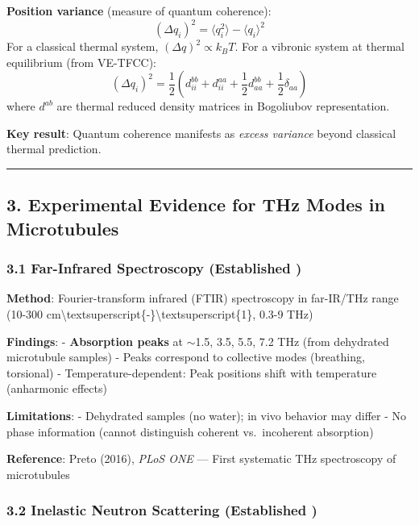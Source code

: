 \textbf{Position variance} (measure of quantum coherence):
\[(\Delta q_i)^2 = \langle q_i^2 \rangle - \langle q_i \rangle^2\] For a
classical thermal system, \((\Delta q)^2 \propto k_B T\). For a vibronic
system at thermal equilibrium (from VE-TFCC):
\[(\Delta q_i)^2 = \frac{1}{2} \left( d_{ii}^{bb} + d_{ii}^{aa} + \frac{1}{2} d_{aa}^{bb} + \frac{1}{2} \delta_{aa} \right)\]
where \(d^{ab}\) are thermal reduced density matrices in Bogoliubov
representation.

\textbf{Key result}: Quantum coherence manifests as \emph{excess
variance} beyond classical thermal prediction.

\begin{center}\rule{0.5\linewidth}{0.5pt}\end{center}

\subsection{3. Experimental Evidence for THz Modes in
Microtubules}\label{experimental-evidence-for-thz-modes-in-microtubules}

\subsubsection{3.1 Far-Infrared Spectroscopy (Established
)}\label{far-infrared-spectroscopy-established}

\textbf{Method}: Fourier-transform infrared (FTIR) spectroscopy in
far-IR/THz range (10-300
cm\textbackslash textsuperscript\{-\}\textbackslash textsuperscript\{1\},
0.3-9 THz)

\textbf{Findings}: - \textbf{Absorption peaks} at $\sim$1.5,
3.5, 5.5, 7.2 THz (from dehydrated microtubule samples) - Peaks
correspond to collective modes (breathing, torsional) -
Temperature-dependent: Peak positions shift with temperature (anharmonic
effects)

\textbf{Limitations}: - Dehydrated samples (no water); in vivo behavior
may differ - No phase information (cannot distinguish coherent
vs.~incoherent absorption)

\textbf{Reference}: Preto (2016), \emph{PLoS ONE} --- First
systematic THz spectroscopy of microtubules

\subsubsection{3.2 Inelastic Neutron Scattering (Established
)}\label{inelastic-neutron-scattering-established}

